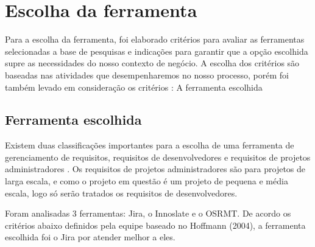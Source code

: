 \section{Escolha da ferramenta}
    
Para a escolha da ferramenta, foi elaborado critérios para avaliar as ferramentas selecionadas a base de pesquisas e indicações para garantir que a opção escolhida supre as necessidades do nosso contexto de negócio. A escolha dos critérios são baseadas nas atividades que desempenharemos no nosso processo, porém foi também levado em consideração os critérios \cite{hoffmann2004}:
A ferramenta escolhida

\subsection{Ferramenta escolhida}

Existem duas classificações importantes para a escolha de uma ferramenta de gerenciamento de requisitos, requisitos de desenvolvedores e requisitos de projetos administradores \cite{hoffmann2004}. Os requisitos de projetos administradores são para projetos de larga escala, e como o projeto em questão é um projeto de pequena e média escala, logo só serão tratados os requisitos de desenvolvedores.

Foram analisadas 3 ferramentas: Jira, o Innoslate e o OSRMT. De acordo os critérios abaixo definidos pela equipe baseado no Hoffmann (2004), a ferramenta escolhida foi o Jira por atender melhor a eles.

